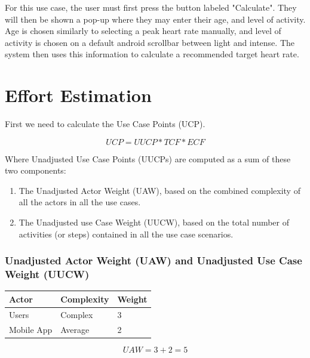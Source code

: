\documentclass[letterpaper,english, 12pt]{scrreprt}
\begin{document}
For this use case, the user must first press the button labeled "Calculate".
They will then be shown a pop-up where they may enter their age, and level of activity.
Age is chosen similarly to selecting a peak heart rate manually, and level of activity is chosen on a default android scrollbar between light and intense.
The system then uses this information to calculate a recommended target heart rate.

\section{Effort Estimation}

First we need to calculate the Use Case Points (UCP).

\begin{equation}
UCP = UUCP* TCF *ECF
\end{equation}

Where Unadjusted Use Case Points (UUCPs) are computed as a sum of these two components:

\begin{enumerate}
\item The Unadjusted Actor Weight (UAW), based on the combined complexity of all the actors in all the use cases.
\item The Unadjusted use Case Weight (UUCW), based on the total number of activities (or steps) contained in all the use case scenarios.
\end{enumerate}


\subsubsection{Unadjusted Actor Weight (UAW) and Unadjusted Use Case Weight (UUCW)}
\begin{center}
        \begin{tabular}{|C{3cm}|C{3cm}|C{3cm}|}
                \hline
                        Actor & Complexity & Weight \\
                \hline
                       Users & Complex & 3 \\
                \hline
                       Mobile App & Average & 2 \\
                \hline
        \end{tabular}
\end{center}

\begin{equation}
UAW = 3 + 2 = 5
\end{equation}
\end{document}

